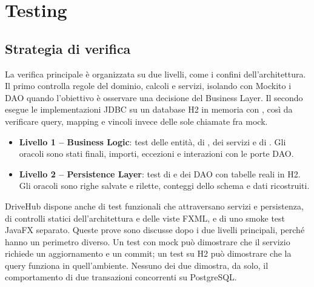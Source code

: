 \chapter{Testing}\label{ch:testing}

\section{Strategia di verifica}
La verifica principale è organizzata su due livelli, come i confini dell'architettura. Il primo controlla regole del dominio, calcoli e servizi, isolando con Mockito i DAO quando l'obiettivo è osservare una decisione del Business Layer. Il secondo esegue le implementazioni JDBC su un database H2 in memoria con , così da verificare query, mapping e vincoli invece delle sole chiamate fra mock.

\begin{itemize}
  \item \textbf{Livello 1 -- Business Logic}: test delle entità, di , dei servizi e di . Gli oracoli sono stati finali, importi, eccezioni e interazioni con le porte DAO.
  \item \textbf{Livello 2 -- Persistence Layer}: test di  e dei DAO  con tabelle reali in H2. Gli oracoli sono righe salvate e rilette, conteggi dello schema e dati ricostruiti.
\end{itemize}

DriveHub dispone anche di test funzionali che attraversano servizi e persistenza, di controlli statici dell'architettura e delle viste FXML, e di uno smoke test JavaFX separato. Queste prove sono discusse dopo i due livelli principali, perché hanno un perimetro diverso. Un test con mock può dimostrare che il servizio richiede un aggiornamento e un commit; un test su H2 può dimostrare che la query funziona in quell'ambiente. Nessuno dei due dimostra, da solo, il comportamento di due transazioni concorrenti su PostgreSQL.

